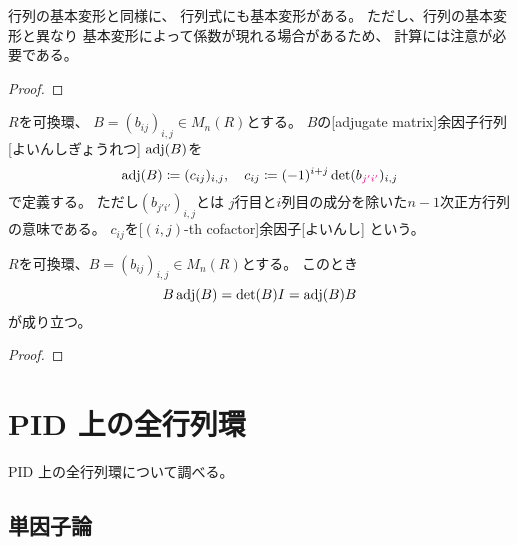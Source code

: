 \documentclass[report]{jlreq}
\begin{document}
行列の基本変形と同様に、
行列式にも基本変形がある。
ただし、行列の基本変形と異なり
基本変形によって係数が現れる場合があるため、
計算には注意が必要である。

\begin{proposition}[行列式の基本変形]
    \TODO{}
\end{proposition}

\begin{proof}
    \TODO{}
\end{proof}

\begin{definition}[余因子行列]
    $R$を可換環、
    $B = (b_{ij})_{i, j} \in M_n(R)$とする。
    $B$の[adjugate matrix]{余因子行列}[よいんしぎょうれつ]
    $\operatorname{adj}(B)$を
    \begin{equation}
        \operatorname{adj}(B) \coloneqq (c_{ij})_{i, j},
        \quad
        c_{ij} \coloneqq (-1)^{i + j} \det (b_{\textcolor{magenta}{j' i'}})_{i, j}
    \end{equation}
    で定義する。
    ただし$(b_{j' i'})_{i, j}$とは
    $j$行目と$i$列目の成分を除いた$n - 1$次正方行列の意味である。
    $c_{ij}$を[$(i, j)$-th cofactor]{余因子}[よいんし]
    という。
\end{definition}

\begin{proposition}
    $R$を可換環、$B = (b_{ij})_{i, j} \in M_n(R)$とする。
    このとき
    \begin{equation}
        B \operatorname{adj}(B) = \det(B) I = \operatorname{adj}(B) B
    \end{equation}
    が成り立つ。
\end{proposition}

\begin{proof}
    \TODO{}
\end{proof}



%
\chapter{PID 上の全行列環}

PID 上の全行列環について調べる。

%
\section{単因子論}
\end{document}
